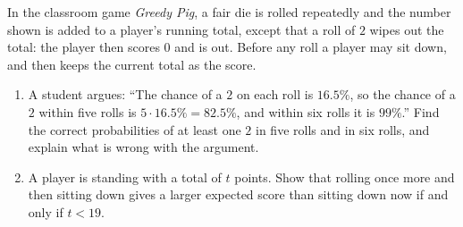 In the classroom game \emph{Greedy Pig}, a fair die is rolled repeatedly and the number shown is added to a player's running total, except that a roll of $2$ wipes out the total: the player then scores $0$ and is out. Before any roll a player may sit down, and then keeps the current total as the score.
\begin{enumerate}
\item[(a)] A student argues: ``The chance of a $2$ on each roll is $16.5\%$, so the chance of a $2$ within five rolls is $5\cdot16.5\%=82.5\%$, and within six rolls it is $99\%$.'' Find the correct probabilities of at least one $2$ in five rolls and in six rolls, and explain what is wrong with the argument.
\item[(b)] A player is standing with a total of $t$ points. Show that rolling once more and then sitting down gives a larger expected score than sitting down now if and only if $t<19$.
\end{enumerate}
